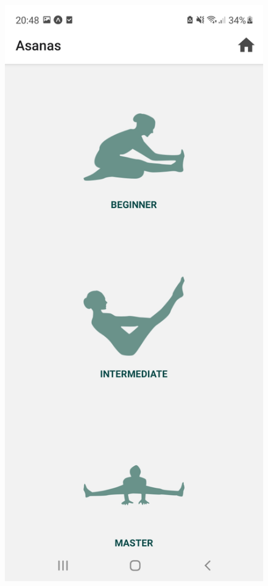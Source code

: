 \documentclass[a4paper, 12pt]{book}
\begin{document}
\begin{figure}[!htbp]
\centering
\begin{minipage}[b]{0.32\textwidth}
    \includegraphics[width=\textwidth]{asanas.jpg}\centering

\end{minipage}
\end{figure}
\end{document}
